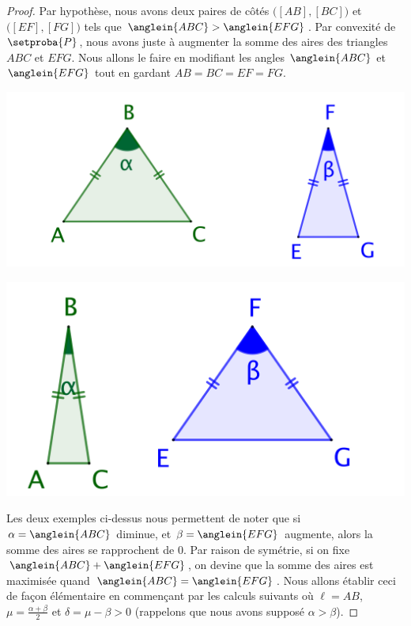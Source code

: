 \begin{proof}
	Par hypothèse, nous avons deux paires de côtés
	$\big( [AB] , [BC] \big)$ et
	$\big( [EF] , [FG] \big)$ tels que
	$\anglein{ABC} > \anglein{EFG}$.
	Par convexité de $\setproba{P}$, nous avons juste à augmenter la somme des aires des triangles $ABC$ et $EFG$.
	Nous allons le faire en modifiant les angles $\anglein{ABC}$ et $\anglein{EFG}$ tout en gardant $AB = BC = EF = FG$.
	\begin{multicols}{2}
		\centering

		\includegraphics[scale=.4]{content/polygon/necessary-cond/2-eq-angles-1.png}

		\includegraphics[scale=.4]{content/polygon/necessary-cond/2-eq-angles-2.png}
	\end{multicols}

	Les deux exemples ci-dessus nous permettent de noter que si $\alpha = \anglein{ABC}$ diminue, et $\beta = \anglein{EFG}$ augmente, alors la somme des aires se rapprochent de $0$.
	Par raison de symétrie, si on fixe $\anglein{ABC} + \anglein{EFG}$, on devine que la somme des aires est maximisée quand $\anglein{ABC} = \anglein{EFG}$.
	Nous allons établir ceci de façon élémentaire en commençant par les calculs suivants où
	$\ell = AB$,
	$\mu = \frac{\alpha + \beta}{2}$ et
	$\delta = \mu - \beta > 0$ (rappelons que nous avons supposé $\alpha > \beta$).


\end{proof}
